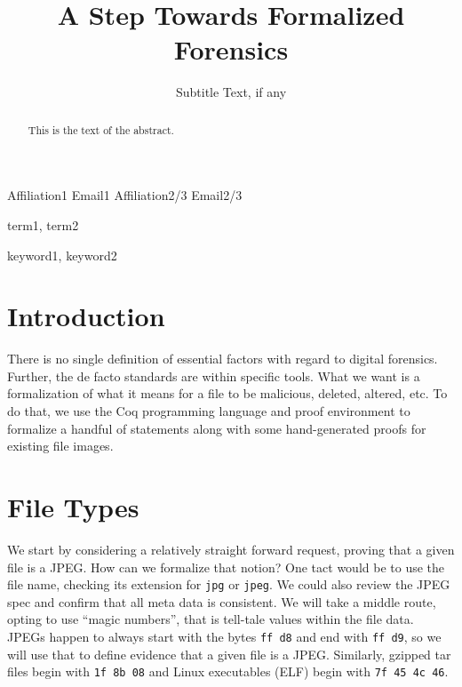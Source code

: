\documentclass[nocopyrightspace]{sigplanconf}
\begin{document}
\lstset{language=coq, basicstyle=\ttfamily, columns=fixed, frame=single}

\setlength{\pdfpageheight}{\paperheight}
\setlength{\pdfpagewidth}{\paperwidth}



\title{A Step Towards Formalized Forensics}
\subtitle{Subtitle Text, if any}

           {Affiliation1}
           {Email1}
           {Affiliation2/3}
           {Email2/3}

\maketitle

\begin{abstract}
This is the text of the abstract.
\end{abstract}


\terms
term1, term2

\keywords
keyword1, keyword2

\section{Introduction}

There is no single definition of essential factors with regard to digital
forensics. Further, the de facto standards are within specific tools. What we
want is a formalization of what it means for a file to be malicious, deleted,
altered, etc. To do that, we use the Coq programming language and proof
environment to formalize a handful of statements along with some
hand-generated proofs for existing file images.

\section{File Types}

We start by considering a relatively straight forward request, proving that a
given file is a JPEG. How can we formalize that notion? One tact would be to
use the file name, checking its extension for {\tt jpg} or {\tt jpeg}. We
could also review the JPEG spec and confirm that all meta data is consistent.
We will take a middle route, opting to use ``magic numbers'', that is
tell-tale values within the file data. JPEGs happen to always start with the
bytes {\tt ff d8} and end with {\tt ff d9}, so we will use that to define
evidence that a given file is a JPEG. Similarly, gzipped tar files begin with
{\tt 1f 8b 08} and Linux executables (ELF) begin with {\tt 7f 45 4c 46}.
\end{document}
